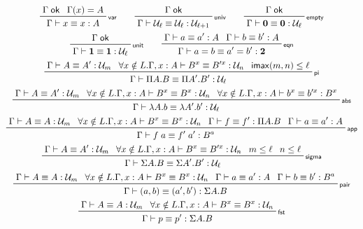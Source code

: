 \documentclass[acmsmall,screen,review]{acmart}
\newcommand{\mc}[1]{\ensuremath{\mathcal{#1}}}
\newcommand{\mb}[1]{\ensuremath{\mathbf{#1}}}
\newcommand{\ms}[1]{\ensuremath{\mathsf{#1}}}
\newcommand{\rle}[1]{{\scriptsize\textsf{#1}}}
\newcommand{\isok}[1]{#1\;\ms{ok}}
\newcommand{\jeq}[4]{#1 \vdash #2 \equiv #3 : #4}
\newcommand{\imax}[2]{\ms{imax}(#1, #2)}
\newcommand{\opv}[2]{#1^{#2}}
\begin{document}
\begin{gather*}
    \prftree[r]{\rle{var}}
        {\isok{\Gamma}}
        {\Gamma(x) = A}
        {\jeq{\Gamma}{x}{x}{A}} \qquad
    \prftree[r]{\rle{univ}}
        {\isok{\Gamma}}
        {\jeq{\Gamma}{\mc{U}_\ell}{\mc{U}_\ell}{\mc{U}_{\ell + 1}}} \qquad
    \prftree[r]{\rle{empty}}
        {\isok{\Gamma}}
        {\jeq{\Gamma}{\mb{0}}{\mb{0}}{\mc{U}_\ell}} \\
    \prftree[r]{\rle{unit}}
        {\isok{\Gamma}}
        {\jeq{\Gamma}{\mb{1}}{\mb{1}}{\mc{U}_\ell}} \qquad
    \prftree[r]{\rle{eqn}}
        {\jeq{\Gamma}{a}{a'}{A}}
        {\jeq{\Gamma}{b}{b'}{A}}
        {\jeq{\Gamma}{a = b}{a' = b'}{\mb{2}}} \\
    \prftree[r]{\rle{pi}}
        {\jeq{\Gamma}{A}{A'}{\mc{U}_m}}
        {\forall x \notin L .
            \jeq{\Gamma, x : A}{\opv{B}{x}}{\opv{B'}{x}}{\mc{U}_n}}
        {\imax{m}{n} \leq \ell}
        {\jeq{\Gamma}{\Pi A . B}{\Pi A' . B'}{\mc{U}_{\ell}}} \\
    \prftree[r]{\rle{abs}}
        {\jeq{\Gamma}{A}{A'}{\mc{U}_m}}
        {\forall x \notin L .
            \jeq{\Gamma, x : A}{\opv{B}{x}}{\opv{B}{x}}{\mc{U}_n}}
        {\forall x \notin L .
            \jeq{\Gamma, x : A}{\opv{b}{x}}{\opv{b'}{x}}{\opv{B}{x}}}
        {\jeq{\Gamma}{\lambda A . b}{\lambda A' . b'}{\mc{U}_{\ell}}} \\
    \prftree[r]{\rle{app}}
        {\jeq{\Gamma}{A}{A}{\mc{U}_m}}
        {\forall x \notin L .
            \jeq{\Gamma, x : A}{\opv{B}{x}}{\opv{B}{x}}{\mc{U}_n}}
        {\jeq{\Gamma}{f}{f'}{\Pi A . B}}
        {\jeq{\Gamma}{a}{a'}{A}}
        {\jeq{\Gamma}{f\;a}{f'\;a'}{\opv{B}{a}}} \\
    \prftree[r]{\rle{sigma}}
        {\jeq{\Gamma}{A}{A'}{\mc{U}_m}}
        {\forall x \notin L .
            \jeq{\Gamma, x : A}{\opv{B}{x}}{\opv{B'}{x}}{\mc{U}_n}}
        {m \leq \ell}
        {n \leq \ell}
        {\jeq{\Gamma}{\Sigma A . B}{\Sigma A' . B'}{\mc{U}_{\ell}}} \\
    \prftree[r]{\rle{pair}}
        {\jeq{\Gamma}{A}{A}{\mc{U}_m}}
        {\forall x \notin L .
            \jeq{\Gamma, x : A}{\opv{B}{x}}{\opv{B}{x}}{\mc{U}_n}}
        {\jeq{\Gamma}{a}{a'}{A}}
        {\jeq{\Gamma}{b}{b'}{\opv{B}{a}}}
        {\jeq{\Gamma}{(a, b)}{(a', b')}{\Sigma A . B}} \\
    \prftree[r]{\rle{fst}}
        {\jeq{\Gamma}{A}{A}{\mc{U}_m}}
        {\forall x \notin L .
            \jeq{\Gamma, x : A}{\opv{B}{x}}{\opv{B}{x}}{\mc{U}_n}}
        {\jeq{\Gamma}{p}{p'}{\Sigma A . B}}

\end{gather*}
\end{document}
